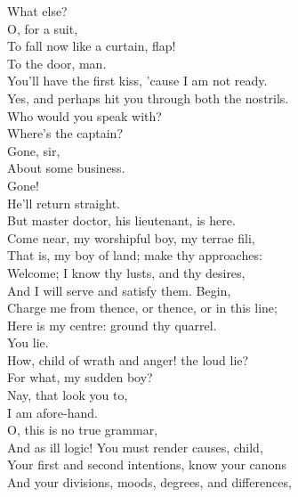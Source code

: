 \documentclass[a4paper,oneside]{memoir}
\begin{document}
\begin{drama*}
\subtlespeaks {} What else?\\
\facespeaks {} O, for a suit,\\
To fall now like a curtain, flap!\\
\subtlespeaks {} To the door, man.\\
\facespeaks You'll have the first kiss, 'cause I am not ready.\\
\subtlespeaks Yes, and perhaps hit you through both the nostrils.\\
\facespeaks {} Who would you speak with?\\
\kastrilspeaks {} Where's the captain?\\
\facespeaks {} Gone, sir,\\
About some business.\\
\kastrilspeaks {} Gone!\\
\facespeaks {} He'll return straight.\\
But master doctor, his lieutenant, is here.\\
\subtlespeaks Come near, my worshipful boy, my terrae fili,\\
That is, my boy of land; make thy approaches:\\
Welcome; I know thy lusts, and thy desires,\\
And I will serve and satisfy them. Begin,\\
Charge me from thence, or thence, or in this line;\\
Here is my centre: ground thy quarrel.\\
\kastrilspeaks {} You lie.\\
\subtlespeaks How, child of wrath and anger! the loud lie?\\
For what, my sudden boy?\\
\kastrilspeaks {} Nay, that look you to,\\
I am afore-hand.\\
\subtlespeaks {} O, this is no true grammar,\\
And as ill logic! You must render causes, child,\\
Your first and second intentions, know your canons\\
And your divisions, moods, degrees, and differences,\\

\end{drama*}
\end{document}
